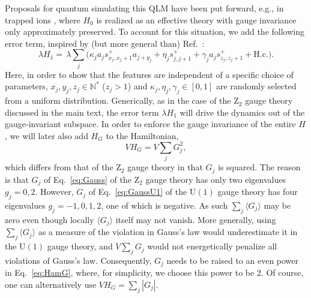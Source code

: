 \documentclass[aps,prl,reprint,twocolumn,superscriptaddress,floatfix,nofootinbib]{revtex4-1}
\begin{document}
Proposals for quantum simulating this QLM have been put forward, e.g., in trapped ions \cite{Hauke2013-S,Yang2016-S}, where $H_0$ is realized as an effective theory with gauge invariance only approximately preserved. To account for this situation, we add the following error term, inspired by (but more general than) Ref.~\cite{Yang2016-S}: 
\begin{equation}\label{eq:Ham1}
\lambda H_1=\,\lambda\sum_j\big(\kappa_ja_js_{x_j,x_j+1}^+ a_{j+y_j}  +\eta_js_{j,j+1}^+ +\gamma_ja_j s_{z_j,z_j+1}^++\text{H.c.}\big).
\end{equation}
Here, in order to show that the features are independent of a specific choice of parameters, $x_j,y_j,z_j\in\mathbb{N}^*$ ($z_j>1$) and $\kappa_j,\eta_j,\gamma_j\in[0,1]$ are randomly selected from a uniform distribution. Generically, as in the case of the $\mathrm{Z}_2$ gauge theory discussed in the main text, the error term $\lambda H_1$ will drive the dynamics out of the gauge-invariant subspace. In order to enforce the gauge invariance of the entire $H$, we will later also add $H_G$ to the Hamiltonian, 
\begin{equation}\label{eq:HamG}
V H_G=V\sum_jG_j^2,
\end{equation}
which differs from that of the $\mathrm{Z}_2$ gauge theory in that $G_j$ is squared. The reason is that $G_j$ of Eq.~\eqref{eq:Gauss} of the $\mathrm{Z}_2$ gauge theory has only two eigenvalues $g_j=0,2$. However, $G_j$ of Eq.~\eqref{eq:GaussU1} of the $\mathrm{U}(1)$ gauge theory has four eigenvalues $g_j=-1,0,1,2$, one of which is negative. As such $\sum_j\langle G_j\rangle$ may be zero even though locally $\langle G_j\rangle$ itself may not vanish. More generally, using $\sum_j\langle G_j\rangle$ as a measure of the violation in Gauss's law would underestimate it in the $\mathrm{U}(1)$ gauge theory, and $V\sum_j G_j$ would not energetically penalize all violations of Gauss's law. Consequently, $G_j$ needs to be raised to an even power in Eq.~\eqref{eq:HamG}, where, for simplicity, we choose this power to be $2$. Of course, one can alternatively use $VH_G=\sum_j|G_j|$.
\end{document}
